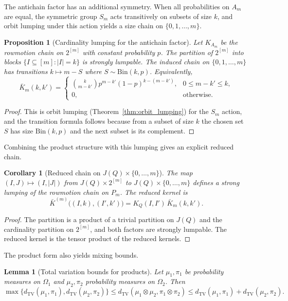 \documentclass[final,3p,times]{elsarticle}
\newtheorem{proposition}[theorem]{Proposition}
\newtheorem{lemma}[theorem]{Lemma}
\newtheorem{corollary}[theorem]{Corollary}
\theoremstyle{definition}
\newcommand{\TV}{d_{\mathrm{TV}}}
\begin{document}
The antichain factor has an additional symmetry.
When all probabilities on $A_m$ are equal, the symmetric group $S_m$ acts transitively on subsets of size $k$, and orbit lumping under this action yields a size chain on $\{0,1,\dots,m\}$.

\begin{proposition}[Cardinality lumping for the antichain factor]\label{prop:antichain_card_lumping}
Let $K_{A_m}$ be the rowmotion chain on $2^{[m]}$ with constant probability $p$.
The partition of $2^{[m]}$ into blocks $\{I\subseteq[m]: |I|=k\}$ is strongly lumpable.
The induced chain on $\{0,1,\dots,m\}$ has transitions $k \mapsto m-S$ where $S\sim \mathrm{Bin}(k,p)$.
Equivalently,
\[
\bar K_m(k,k')=
\begin{cases}
\binom{k}{m-k'}p^{m-k'}(1-p)^{k-(m-k')}, & 0\le m-k'\le k,\\
0, & \text{otherwise}.
\end{cases}
\]
\end{proposition}

\begin{proof}
This is orbit lumping (Theorem~\ref{thm:orbit_lumping}) for the $S_m$ action, and the transition formula follows because from a subset of size $k$ the chosen set $S$ has size $\mathrm{Bin}(k,p)$ and the next subset is its complement.
\end{proof}

Combining the product structure with this lumping gives an explicit reduced chain.

\begin{corollary}[Reduced chain on $J(Q)\times\{0,\dots,m\}$]\label{cor:Q_plus_antichain_reduced}
The map $(I,J)\mapsto (I,|J|)$ from $J(Q)\times 2^{[m]}$ to $J(Q)\times\{0,\dots,m\}$ defines a strong lumping of the rowmotion chain on $P_m$.
The reduced kernel is
\[
\bar K^{(m)}\bigl((I,k),(I',k')\bigr)=K_Q(I,I')\,\bar K_m(k,k').
\]
\end{corollary}

\begin{proof}
The partition is a product of a trivial partition on $J(Q)$ and the cardinality partition on $2^{[m]}$, and both factors are strongly lumpable.
The reduced kernel is the tensor product of the reduced kernels.
\end{proof}

The product form also yields mixing bounds.

\begin{lemma}[Total variation bounds for products]\label{lem:TV_product_bounds}
Let $\mu_1,\pi_1$ be probability measures on $\Omega_1$ and $\mu_2,\pi_2$ probability measures on $\Omega_2$.
Then
\[
\max\{\TV(\mu_1,\pi_1),\TV(\mu_2,\pi_2)\}
\le
\TV(\mu_1\otimes\mu_2,\pi_1\otimes\pi_2)
\le
\TV(\mu_1,\pi_1)+\TV(\mu_2,\pi_2).
\]
\end{lemma}
\end{document}
